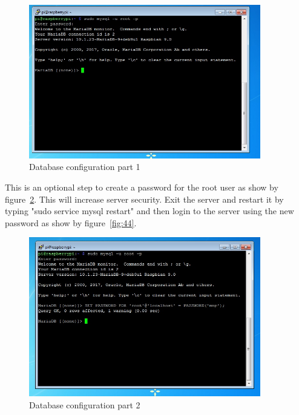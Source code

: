 \documentclass[12pt,]{article}
\begin{document}
\begin{figure}[H]
  	\begin{center}
    	\includegraphics[width=0.9\textwidth]{Ras_24}
  	\end{center}
  	\caption{Database configuration part 1}
	\label{fig:42}
\end{figure}
This is an optional step to create a password for the root user as show by figure~\ref{fig:43}. This will increase server security. Exit the server and restart it by typing "sudo service mysql restart" and then login to the server using the new password as show by figure~\ref{fig:44}.
\begin{figure}[H]
  	\begin{center}
    	\includegraphics[width=0.9\textwidth]{Ras_25}
  	\end{center}
  	\caption{Database configuration part 2}
	\label{fig:43}
\end{figure}
\end{document}
